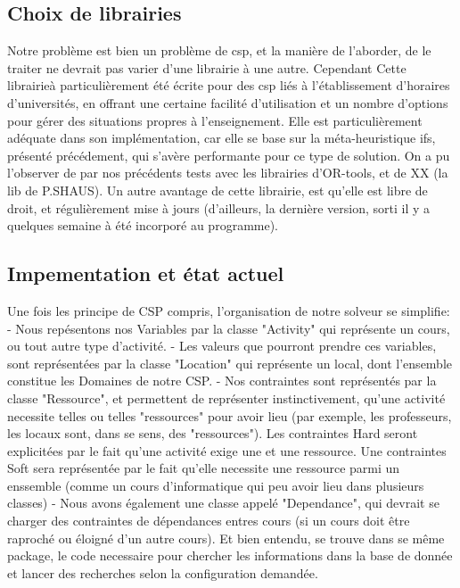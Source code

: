 \subsection{Choix de librairies}
Notre problème est bien un problème de csp, et la manière de l'aborder, de le traiter ne devrait pas varier d'une librairie à une autre.  Cependant Cette librairieà particulièrement été écrite pour des csp liés à l'établissement d'horaires d'universités, en offrant une certaine facilité d'utilisation et un nombre d'options pour gérer des situations propres à l'enseignement.
Elle est particulièrement adéquate dans son implémentation, car elle se base sur la méta-heuristique ifs, présenté précédement, qui s'avère performante pour ce type de solution.  On a pu l'observer de par nos précédents tests avec les librairies d'OR-tools, et de XX (la lib de P.SHAUS).
\newline
\indent
Un autre avantage de cette librairie, est qu'elle est libre de droit, et régulièrement mise à jours (d'ailleurs, la dernière version, sorti il y a quelques semaine à été incorporé au programme).


\subsection{Impementation et état actuel}
Une fois les principe de CSP compris, l'organisation de notre solveur se simplifie: 
- Nous repésentons nos Variables par la classe "Activity" qui représente un cours, ou tout autre type d'activité.\newline
- Les valeurs que pourront prendre ces variables, sont représentées par la classe "Location" qui représente un local, dont l'ensemble constitue les Domaines de notre CSP.\newline
- Nos contraintes sont représentés par la classe "Ressource", et permettent de représenter instinctivement, qu'une activité necessite telles ou telles "ressources" pour avoir lieu (par exemple, les professeurs, les locaux sont, dans se sens, des "ressources"). Les contraintes Hard seront explicitées par le fait qu'une activité exige une et une ressource. Une contraintes Soft sera représentée par le fait qu'elle necessite une ressource parmi un enssemble (comme un cours d'informatique qui peu avoir lieu dans plusieurs classes) \newline
- Nous avons également une classe appelé "Dependance", qui devrait se charger des contraintes de dépendances entres cours (si un cours doit être raproché ou éloigné d'un autre cours). \newline
Et bien entendu, se trouve dans se même package, le code necessaire pour chercher les informations dans la base de donnée et lancer des recherches selon la configuration demandée.

